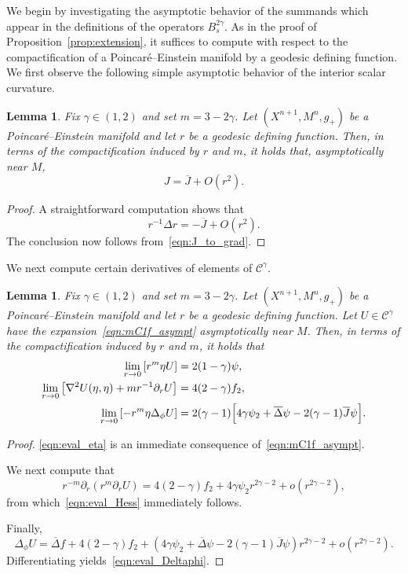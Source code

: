 \documentclass{amsart}
\newtheorem{lem}[thm]{Lemma}
\theoremstyle{definition}
\theoremstyle{remark}
\numberwithin{equation}{section}
\begin{document}
We begin by investigating the asymptotic behavior of the summands which appear in the definitions of the operators $B_{s}^{2\gamma}$.  As in the proof of Proposition~\ref{prop:extension}, it suffices to compute with respect to the compactification of a Poincar\'e--Einstein manifold by a geodesic defining function.  We first observe the following simple asymptotic behavior of the interior scalar curvature.

\begin{lem}
 \label{lem:eval}
 Fix $\gamma\in(1,2)$ and set $m=3-2\gamma$.  Let $(X^{n+1},M^n,g_+)$ be a Poincar\'e--Einstein manifold and let $r$ be a geodesic defining function.  Then, in terms of the compactification induced by $r$ and $m$, it holds that, asymptotically near $M$,
 \begin{equation}
  \label{eqn:eval}
  J = {\overline{J}} + O(r^2) .
 \end{equation}
\end{lem}

\begin{proof}
 A straightforward computation shows that
 \[ r^{-1}\Delta r = -{\overline{J}} + O(r^2) . \]
 The conclusion now follows from~\eqref{eqn:J_to_grad}.
\end{proof}

We next compute certain derivatives of elements of ${\mathcal{C}}^\gamma$.

\begin{lem}
 \label{lem:evalU}
 Fix $\gamma\in(1,2)$ and set $m=3-2\gamma$.  Let $(X^{n+1},M^n,g_+)$ be a Poincar\'e--Einstein manifold and let $r$ be a geodesic defining function.  Let $U\in{\mathcal{C}}^\gamma$ have the expansion~\eqref{eqn:mC1f_asympt} asymptotically near $M$.  Then, in terms of the compactification induced by $r$ and $m$, it holds that
 \begin{align}
  \label{eqn:eval_eta} \lim_{r\to0} \left[r^m\eta U\right] & = 2(1-\gamma)\psi , \\
  \label{eqn:eval_Hess} \lim_{r\to0} \left[\nabla^2U(\eta,\eta) + mr^{-1}\partial_r U\right] & = 4(2-\gamma)f_2 , \\
  \label{eqn:eval_Deltaphi} \lim_{r\to0} \left[-r^m\eta\Delta_\phi U\right] & = 2(\gamma-1)\Bigl[4\gamma\psi_2 + {\overline{\Delta}}\psi - 2(\gamma-1){\overline{J}}\psi\Bigr] .
 \end{align}
\end{lem}

\begin{proof}
 \eqref{eqn:eval_eta} is an immediate consequence of~\eqref{eqn:mC1f_asympt}.

 We next compute that
 \[ r^{-m}\partial_r\left(r^m\partial_rU\right) = 4(2-\gamma)f_2 + 4\gamma\psi_2r^{2\gamma-2} + o(r^{2\gamma-2}), \]
 from which~\eqref{eqn:eval_Hess} immediately follows.

 Finally,
 \[ \Delta_\phi U = {\overline{\Delta}} f + 4(2-\gamma)f_2 + \left(4\gamma\psi_2 + {\overline{\Delta}}\psi - 2(\gamma-1){\overline{J}}\psi\right)r^{2\gamma-2} + o(r^{2\gamma-2}) . \]
 Differentiating yields~\eqref{eqn:eval_Deltaphi}.
\end{proof}
\end{document}
